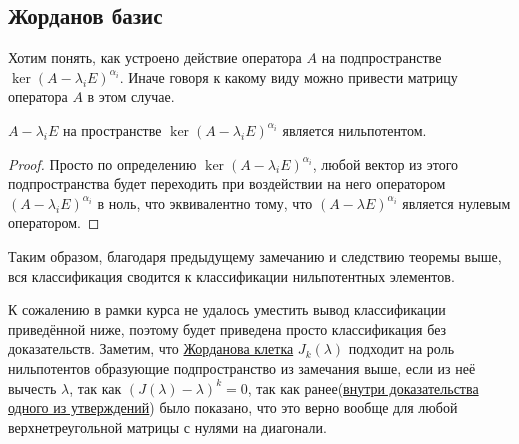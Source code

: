 \subsection{Жорданов базис}
\begin{motivation}
    Хотим понять, как устроено действие оператора $A$ на подпространстве $\ker (A - \lambda_iE)^{\alpha_i}$.
    Иначе говоря к какому виду можно привести матрицу оператора $A$ в этом случае.
\end{motivation}
\begin{remark}
    $A - \lambda_iE$ на пространстве $\ker(A - \lambda_iE)^{\alpha_i}$ является нильпотентом.
\end{remark}
\begin{proof}
    Просто по определению $\ker (A - \lambda_i E)^{\alpha_i}$, любой вектор из этого
    подпространства будет переходить при воздействии на него оператором 
    $(A - \lambda_i E)^{\alpha_i}$ в ноль, что эквивалентно тому, что 
    $(A - \lambda E)^{\alpha_i}$ является нулевым оператором.
\end{proof}
\begin{follow}
    Таким образом, благодаря предыдущему замечанию и следствию теоремы выше,
    вся классификация сводится к классификации нильпотентных элементов.
\end{follow}

К сожалению в рамки курса не удалось уместить вывод классификации приведённой ниже,
поэтому будет приведена просто классификация без доказательств.
Заметим, что \hyperref[def:жорданова клетка]{Жорданова клетка} $J_k(\lambda)$ 
подходит на роль нильпотентов образующие подпространство из замечания выше,
если из неё вычесть $\lambda$, так как $(J(\lambda) - \lambda)^k = 0$, так как
ранее(\hyperref[fix:nilpotent]{внутри доказательства одного из утверждений})
было показано, что это верно вообще для любой верхнетреугольной матрицы с нулями
на диагонали.

